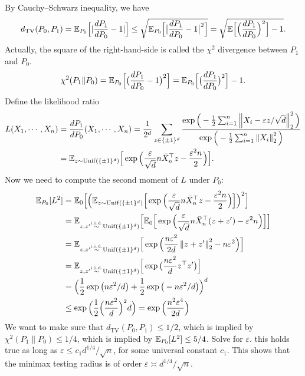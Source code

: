 \documentclass[11pt,letterpaper]{article}
\numberwithin{theorem}{lecture}
\numberwithin{proposition}{lecture}
\numberwithin{lemma}{lecture}
\numberwithin{claim}{lecture}
\numberwithin{corollary}{lecture}
\numberwithin{definition}{lecture}
\numberwithin{conjecture}{lecture}
\numberwithin{remark}{lecture}
\numberwithin{example}{lecture}
\numberwithin{equation}{lecture}
\begin{document}
By Cauchy--Schwarz inequality, we have
\begin{align*}
  d_{\mathrm{TV}} (P_0, P_1) = {\mathbb{E}}_{P_0} \Big[| \frac{dP_1}{dP_0} - 1 |\Big] \leq \sqrt{{\mathbb{E}}_{P_0} \Big[ \big| \frac{dP_1}{dP_0} - 1 \big|^2 \Big]} = \sqrt{{\mathbb{E}} \Big[ \Big( \frac{dP_1}{dP_0} \Big)^2 \Big] - 1}.
\end{align*}
Actually, the square of the right-hand-side is called the $\chi^2$ divergence between $P_1$ and $P_0$.
\begin{align*}
  \chi^2 (P_1 \| P_0) = {\mathbb{E}}_{P_0} \Big[ \big( \frac{dP_1}{dP_0} - 1 \big)^2 \Big] = {\mathbb{E}}_{P_0} \Big[ \big( \frac{dP_1}{dP_0} \big)^2 \Big] - 1.
\end{align*}
Define the likelihood ratio
\begin{align*}
  L (X_1, \cdots, X_n) &= \frac{dP_1}{dP_0} (X_1, \cdots, X_n) = \frac{1}{2^d} \sum_{z \in \{\pm 1\}^d} \dfrac{\exp \Big( - \frac{1}{2} \sum_{i = 1}^n \left\| X_i - \varepsilon z / \sqrt{d}\right\|_{2}^2 \Big)}{\exp \Big( - \frac{1}{2} \sum_{i = 1}^n \left\| X_i \right\|_{2}^2 \Big)}\\
  & = {\mathbb{E}}_{z \sim \mathrm{Unif} (\{\pm 1\}^d)} \Big[ \exp \Big( \frac{\varepsilon}{\sqrt{d}} n \bar{X}_n^\top z - \frac{\varepsilon^2 n}{2} \Big) \Big].
\end{align*}
Now we need to compute the second moment of $L$ under $P_0$:
\begin{align*}
  {\mathbb{E}}_{P_0} [L^2] &= {\mathbb{E}}_0 \Big[ \Big({\mathbb{E}}_{z \sim \mathrm{Unif} (\{\pm 1\}^d)} \Big[ \exp \Big( \frac{\varepsilon}{\sqrt{d}} n \bar{X}_n^\top z - \frac{\varepsilon^2 n}{2} \Big) \Big] \Big)^2\Big]\\
  &= {\mathbb{E}}_{z, z' \overset{\mathrm{i.i.d.}}{\sim} \mathrm{Unif} (\{\pm 1\}^d)} \Big[ {\mathbb{E}}_0 \Big[ \exp \Big( \frac{\varepsilon}{\sqrt{d}} n \bar{X}_n^\top (z + z') - \varepsilon^2 n \Big) \Big] \Big]\\
  &= {\mathbb{E}}_{z, z' \overset{\mathrm{i.i.d.}}{\sim} \mathrm{Unif} (\{\pm 1\}^d)} \Big[ \exp \Big( \frac{n \varepsilon^2}{2d} \left\| z + z'\right\|_{2}^2 - n \varepsilon^2 \Big) \Big]\\
  &= {\mathbb{E}}_{z, z' \overset{\mathrm{i.i.d.}}{\sim} \mathrm{Unif} (\{\pm 1\}^d)} \Big[ \exp \big( \frac{n \varepsilon^2}{d} z^\top z' \big) \Big]\\
  & = \Big( \frac{1}{2} \exp \big( n \varepsilon^2 / d \big) + \frac{1}{2} \exp \big( - n \varepsilon^2 / d \big) \Big)^d\\
  &\leq \exp \Big( \frac{1}{2} \Big( \frac{n \varepsilon^2}{d} \Big)^2 d \Big) = \exp \Big( \frac{n^2 \varepsilon^4}{2d} \Big)
\end{align*}
We want to make sure that $d_{\mathrm{TV}} (P_0, P_1) \leq 1/2$, which is implied by $\chi^2 (P_1 \| P_0) \leq 1/4$, which is implied by ${\mathbb{E}}_{P_0} [L^2] \leq 5/4$. Solve for $\varepsilon$. this holds true as long as $\varepsilon \leq c_1 d^{1/4} / \sqrt{n}$, for some universal constant $c_1$. This shows that the minimax testing radius is of order $\varepsilon \asymp d^{1/4} / \sqrt{n}$.
\end{document}
